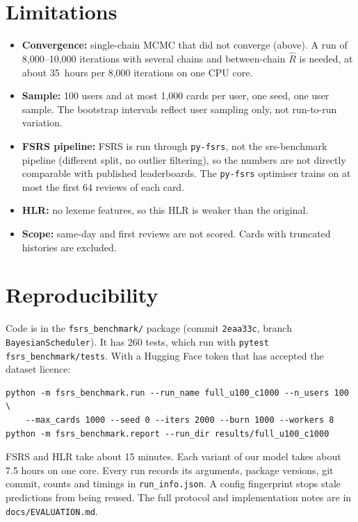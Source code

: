 \documentclass[11pt,a4paper]{article}
\begin{document}
\section{Limitations}
\begin{itemize}
  \item \textbf{Convergence:} single-chain MCMC that did not converge (above). A run of 8{,}000--10{,}000 iterations with several chains and between-chain $\hat R$ is needed, at about 35~hours per 8{,}000 iterations on one CPU core.
  \item \textbf{Sample:} 100 users and at most 1{,}000 cards per user, one seed, one user sample. The bootstrap intervals reflect user sampling only, not run-to-run variation.
  \item \textbf{FSRS pipeline:} FSRS is run through \texttt{py-fsrs}, not the srs-benchmark pipeline (different split, no outlier filtering), so the numbers are not directly comparable with published leaderboards. The \texttt{py-fsrs} optimiser trains on at most the first 64 reviews of each card.
  \item \textbf{HLR:} no lexeme features, so this HLR is weaker than the original.
  \item \textbf{Scope:} same-day and first reviews are not scored. Cards with truncated histories are excluded.
\end{itemize}

\section{Reproducibility}
Code is in the \texttt{fsrs\_benchmark/} package (commit \texttt{2eaa33c}, branch \texttt{BayesianScheduler}). It has 260 tests, which run with \texttt{pytest fsrs\_benchmark/tests}. With a Hugging Face token that has accepted the dataset licence:
\begin{verbatim}
python -m fsrs_benchmark.run --run_name full_u100_c1000 --n_users 100 \
    --max_cards 1000 --seed 0 --iters 2000 --burn 1000 --workers 8
python -m fsrs_benchmark.report --run_dir results/full_u100_c1000
\end{verbatim}
FSRS and HLR take about 15 minutes. Each variant of our model takes about 7.5 hours on one core. Every run records its arguments, package versions, git commit, counts and timings in \texttt{run\_info.json}. A config fingerprint stops stale predictions from being reused. The full protocol and implementation notes are in \texttt{docs/EVALUATION.md}.
\end{document}
